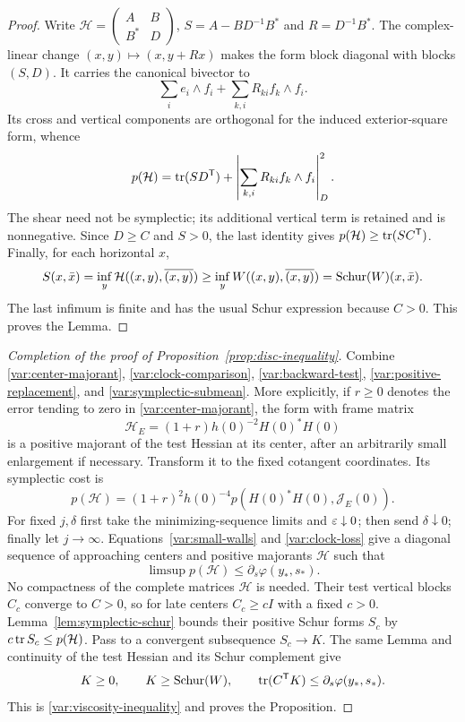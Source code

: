 \begin{proof}
Write $\mathcal H=\left(\begin{smallmatrix}A&B\\B^*&D\end{smallmatrix}\right)$,
$S=A-BD^{-1}B^*$ and $R=D^{-1}B^*$.
The complex-linear change $(x,y)\mapsto(x,y+Rx)$ makes the form
block diagonal with blocks $(S,D)$.  It carries the canonical bivector
to
\[
 \sum_i e_i\wedge f_i+\sum_{k,i}R_{ki}f_k\wedge f_i.
\]
Its cross and vertical components are orthogonal for the induced
exterior-square form, whence
\[
 p(\mathcal H)=\operatorname{tr}(SD^{\mathsf T})+
       \left|\sum_{k,i}R_{ki}f_k\wedge f_i\right|_D^2.
\]
The shear need not be symplectic; its additional vertical term is
retained and is nonnegative.  Since $D\ge C$ and $S>0$, the last
identity gives $p(\mathcal H)\ge\operatorname{tr}(SC^{\mathsf T})$.
Finally, for each horizontal $x$,
\[
 S(x,\bar x)=\inf_y\mathcal H((x,y),\overline{(x,y)})
 \ge\inf_y W((x,y),\overline{(x,y)})
 =\operatorname{Schur}(W)(x,\bar x).
\]
The last infimum is finite and has the usual Schur expression because
$C>0$.  This proves the Lemma.
\end{proof}

\begin{proof}[Completion of the proof of Proposition~\ref{prop:disc-inequality}]
Combine \eqref{var:center-majorant}, \eqref{var:clock-comparison},
\eqref{var:backward-test}, \eqref{var:positive-replacement}, and
\eqref{var:symplectic-submean}.  More explicitly, if $r\ge0$ denotes
the error tending to zero in \eqref{var:center-majorant}, the form
with frame matrix
\[
 \mathcal H_E=(1+r)h(0)^{-2}H(0)^*H(0)
\]
is a positive majorant of the test Hessian at its center, after an
arbitrarily small enlargement if necessary.  Transform it to the
fixed cotangent coordinates.  Its symplectic cost is
\[
 p(\mathcal H)=(1+r)^2h(0)^{-4}
                 p(H(0)^*H(0),\mathcal J_E(0)).
\]
For fixed $j,\delta$ first take the minimizing-sequence limits and
$\varepsilon\downarrow0$; then send $\delta\downarrow0$; finally let
$j\to\infty$.  Equations~\eqref{var:small-walls} and
\eqref{var:clock-loss} give a diagonal sequence of approaching centers
and positive majorants $\mathcal H$ such that
\[
 \limsup p(\mathcal H)\le\partial_s\varphi(y_*,s_*).
\]
No compactness of the complete matrices $\mathcal H$ is needed.
Their test vertical blocks $C_c$ converge to $C>0$, so for late
centers $C_c\ge cI$ with a fixed $c>0$.
Lemma~\ref{lem:symplectic-schur} bounds their positive Schur forms
$S_c$ by $c\operatorname{tr} S_c\le p(\mathcal H)$.
Pass to a convergent subsequence $S_c\to K$.  The same Lemma and
continuity of the test Hessian and its Schur complement give
\[
 K\ge0,\qquad K\ge\operatorname{Schur}(W),\qquad
 \operatorname{tr}(C^{\mathsf T}K)\le\partial_s\varphi(y_*,s_*).
\]
This is \eqref{var:viscosity-inequality} and proves the Proposition.
\end{proof}
